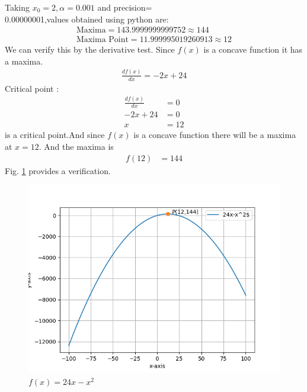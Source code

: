     Taking $x_0=2,\alpha=0.001$ and precision= \\ 0.00000001,values obtained using python are:
    \begin{align}
        \boxed{\text{Maxima} =143.9999999999752 \approx 144 }\\
        \boxed{\text{Maxima Point} =  11.999995019260913\approx 12}
    \end{align}
We can verify this by the derivative test.
Since $f(x)$ is a concave function it has a maxima.
\begin{align}
\frac{df(x)}{dx}=-2x+24
\end{align}
Critical point :
\begin{align}
 \frac{df(x)}{dx}&=0\\
 -2x+24&=0\\
 x&=12
\end{align} 
is a critical point.And since $f(x)$ is a concave function there will be a maxima at $x=12$.
And the maxima is
\begin{align}
f(12)&=144
\end{align}
%
Fig.     \ref{aug/2/4/p(x)}	 provides a verification.
\begin{figure}[!h]
    \centering
    \includegraphics [width=\columnwidth]{solutions/aug/2/4/assignment6.png}
    \caption{$f(x)=24x-x^2$}
    \label{aug/2/4/p(x)}	
\end{figure}

